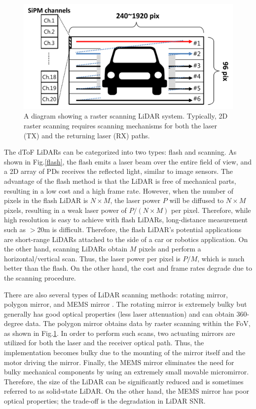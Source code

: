 \documentclass[paper]{ieice}
\begin{document}
\begin{figure}[!t]
\centering
 \includegraphics[width=0.5 \textwidth]{figs/raster.png}
  \caption{A diagram showing a raster scanning LiDAR system. Typically, 2D raster scanning requires scanning mechanisms for both the laser (TX) and the returning laser (RX) paths.}
\label{raster}
\end{figure}

The dToF LiDARs can be categorized into two types: flash \cite{ximenes2018256, padmanabhan20217, lindner2018252} and scanning. As shown in Fig.\ref{flash}, the flash emits a laser beam over the entire field of view, and a 2D array of PDs receives the reflected light, similar to image sensors. The advantage of the flash method is that the LiDAR is free of mechanical parts, resulting in a low cost and a high frame rate. However, when the number of pixels in the flash LiDAR is $N \times M$, the laser power $P$ will be diffused to $N \times M$ pixels, resulting in a weak laser power of $P/(N \times M)$ per pixel. Therefore, while high resolution is easy to achieve with flash LiDARs, long-distance measurement such as $>$20m is difficult. Therefore, the flash LiDAR's potential applications are short-range LiDARs attached to the side of a car or robotics application. On the other hand, scanning LiDARs obtain $M$ pixels and perform a horizontal/vertical scan. Thus, the laser power per pixel is $P/M$, which is much better than the flash. On the other hand, the cost and frame rates degrade due to the scanning procedure.

There are also several types of LiDAR scanning methods: rotating mirror\cite{velodyne,ouster}, polygon mirror\cite{niclass2012100,yoshioka201820,kondo2020automotive}, and MEMS mirror \cite{ito2013system, akita2017imager, kumagai2021189x600}.  The rotating mirror is extremely bulky but generally has good optical properties (less laser attenuation) and can obtain 360-degree data.
The polygon mirror obtains data by raster scanning within the FoV, as shown in Fig.\ref{raster}. In order to perform such scans, two actuating mirrors are utilized for both the laser and the receiver optical path. Thus, the implementation becomes bulky due to the mounting of the mirror itself and the motor driving the mirror.
Finally, the MEMS mirror eliminates the need for bulky mechanical components by using an extremely small movable micromirror. Therefore, the size of the LiDAR can be significantly reduced and is sometimes referred to as solid-state LiDAR. On the other hand, the MEMS mirror has poor optical properties; the trade-off is the degradation in LiDAR SNR.
\end{document}
